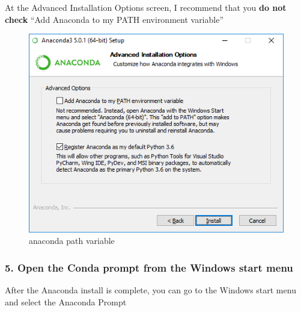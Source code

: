 \documentclass{book}
\makeatletter
\def\maxwidth{\ifdim\Gin@nat@width>\linewidth\linewidth
    \else\Gin@nat@width\fi}
\let\Oldincludegraphics\includegraphics
\renewcommand{\includegraphics}[1]{\Oldincludegraphics[width=.8\maxwidth]{#1}}
\makeatother
\begin{document}
At the Advanced Installation Options screen, I recommend that you
\textbf{do not check} ``Add Anaconda to my PATH environment variable''

\begin{figure}
\centering
\includegraphics{images/anaconda_path2.png}
\caption{anaconda path variable}
\end{figure}

    \subsubsection{5. Open the Conda prompt from the Windows start
menu}\label{open-the-conda-prompt-from-the-windows-start-menu}

After the Anaconda install is complete, you can go to the Windows start
menu and select the Anaconda Prompt
\end{document}
